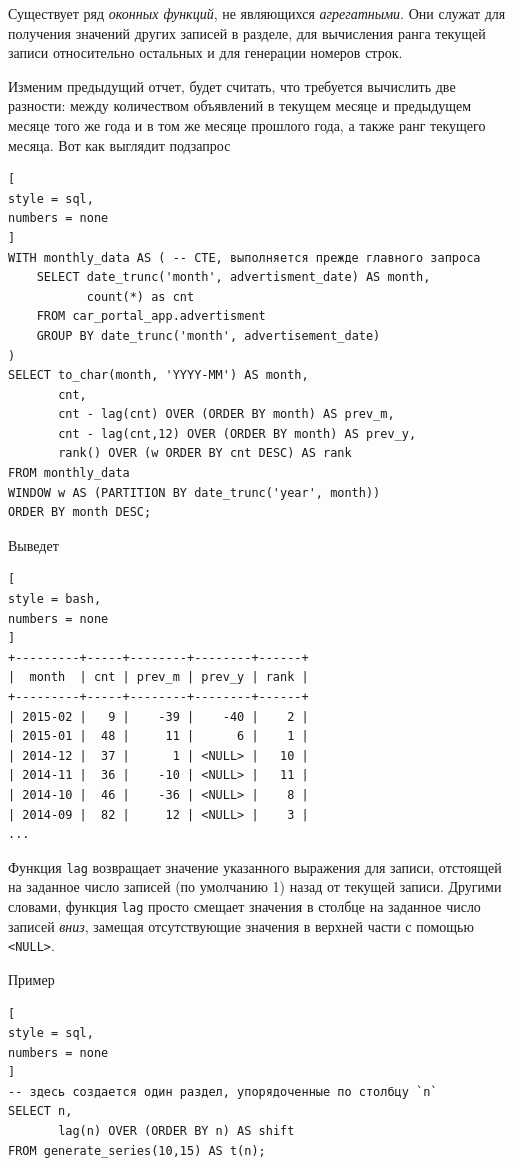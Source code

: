 \documentclass[%
	11pt,
	a4paper,
	utf8,
		]{article}
\begin{document}

Существует ряд \emph{оконных функций}, не являющихся \emph{агрегатными}. Они служат для получения значений других записей в разделе, для вычисления ранга текущей записи относительно остальных и для генерации номеров строк.

Изменим предыдущий отчет, будет считать, что требуется вычислить две разности: между количеством объявлений в текущем месяце и предыдущем месяце того же года и в том же месяце прошлого года, а также ранг текущего месяца. Вот как выглядит подзапрос
\begin{lstlisting}[
style = sql,
numbers = none
]
WITH monthly_data AS ( -- CTE, выполняется прежде главного запроса
    SELECT date_trunc('month', advertisment_date) AS month,
           count(*) as cnt
    FROM car_portal_app.advertisment
    GROUP BY date_trunc('month', advertisement_date)
)
SELECT to_char(month, 'YYYY-MM') AS month,
       cnt,
       cnt - lag(cnt) OVER (ORDER BY month) AS prev_m,
       cnt - lag(cnt,12) OVER (ORDER BY month) AS prev_y,
       rank() OVER (w ORDER BY cnt DESC) AS rank
FROM monthly_data
WINDOW w AS (PARTITION BY date_trunc('year', month))
ORDER BY month DESC;
\end{lstlisting}

Выведет
\begin{lstlisting}[
style = bash,
numbers = none
]
+---------+-----+--------+--------+------+
|  month  | cnt | prev_m | prev_y | rank |
+---------+-----+--------+--------+------+
| 2015-02 |   9 |    -39 |    -40 |    2 |
| 2015-01 |  48 |     11 |      6 |    1 |
| 2014-12 |  37 |      1 | <NULL> |   10 |
| 2014-11 |  36 |    -10 | <NULL> |   11 |
| 2014-10 |  46 |    -36 | <NULL> |    8 |
| 2014-09 |  82 |     12 | <NULL> |    3 |
...
\end{lstlisting}

Функция \texttt{lag} возвращает значение указанного выражения для записи, отстоящей на заданное число записей (по умолчанию 1) назад от текущей записи. Другими словами, функция \texttt{lag} просто смещает значения в столбце на заданное число записей \emph{вниз}, замещая отсутствующие значения в верхней части с помощью \texttt{<NULL>}.

Пример
\begin{lstlisting}[
style = sql,
numbers = none
]
-- здесь создается один раздел, упорядоченные по столбцу `n`
SELECT n,
       lag(n) OVER (ORDER BY n) AS shift
FROM generate_series(10,15) AS t(n);
\end{lstlisting}
\end{document}
